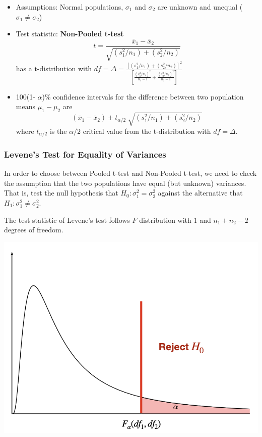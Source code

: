\documentclass[
]{article}
\begin{document}
\begin{itemize}
\item
  Assumptions: Normal populations, \(\sigma_1\) and \(\sigma_2\) are
  unknown and unequal (\(\sigma_1 \neq \sigma_2\))
\item
  Test statistic: \textbf{Non-Pooled t-test}
  \[t=\frac{\bar{x}_{1} -\bar{x}_{2} }{\sqrt{(s_{1}^{2} /n_{1} )+(s_{2}^{2} /n_{2} )} } \]
  has a t-distribution with
  \(df=\Delta=\frac{[(s_{1}^{2} /n_{1} )+(s_{2}^{2} /n_{2} )]^{2} }{\left[\frac{(s_{1}^{2} /n_{1} )^{2} }{n_{1} -1} +\frac{(s_{2}^{2} /n_{2} )^{2} }{n_{2} -1} \right]}\)
\item
  100(1- \(\alpha\))\% confidence intervals for the difference between
  two population means \(\mu_{1} -\mu_{2}\) are
  \[(\bar{x}_{1} -\bar{x}_{2} )\pm t_{\alpha /2} \; \sqrt{(s_{1}^{2} /n_{1} )+(s_{2}^{2} /n_{2} )} \]
  where \(t_{\alpha/2}\) is the \(\alpha/2\) critical value from the
  t-distribution with \(df =\Delta\).
\end{itemize}

\hypertarget{levenes-test-for-equality-of-variances}{%
\subsubsection{Levene's Test for Equality of
Variances}\label{levenes-test-for-equality-of-variances}}

In order to choose between Pooled t-test and Non-Pooled t-test, we need
to check the assumption that the two populations have equal (but
unknown) variances. That is, test the null hypothesis that
\(H_0:\sigma^2_1=\sigma^2_2\) against the alternative that
\(H_1:\sigma^2_1\neq \sigma^2_2\).

The test statistic of Levene's test follows \(F\) distribution with
\(1\) and \(n_1+n_2-2\) degrees of freedom.

\begin{center}\includegraphics[width=1\linewidth,height=1\textheight]{Ftest} \end{center}
\end{document}
